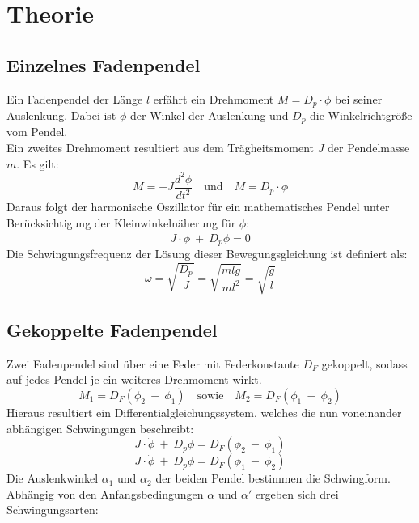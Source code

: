 \section{Theorie}
\label{sec:Theorie}

\subsection{Einzelnes Fadenpendel}
Ein Fadenpendel der Länge $l$ erfährt ein Drehmoment $M = D_p\cdot \phi$ bei seiner Auslenkung.
Dabei ist $\phi$ der Winkel der Auslenkung und $D_p$ die Winkelrichtgröße vom Pendel.\\
Ein zweites Drehmoment resultiert aus dem Trägheitsmoment $J$ der Pendelmasse $m$.
Es gilt:
\begin{equation}
    M = -J\frac{d^2\phi}{dt^2} \quad\textrm{und}\quad M = D_p\cdot \phi
\end{equation}
Daraus folgt der harmonische Oszillator für ein mathematisches Pendel unter Berücksichtigung der Kleinwinkelnäherung für $\phi$:
\begin{equation}
    J\cdot \ddot{\phi}\ +\ D_p\phi = 0
\end{equation}
Die Schwingungsfrequenz der Lösung dieser Bewegungsgleichung ist definiert als:
\begin{equation}
    \omega = \sqrt{\frac{D_p}{J}} = \sqrt{\frac{mlg}{ml^2}} = \sqrt{\frac{g}{l}}
    \label{eq:swingfreq}
\end{equation}

\subsection{Gekoppelte Fadenpendel}
Zwei Fadenpendel sind über eine Feder mit Federkonstante $D_F$ gekoppelt, sodass auf jedes Pendel je ein weiteres Drehmoment wirkt.
\begin{equation}
    M_1 = D_F(\phi_2\ -\ \phi_1) \quad\textrm{sowie}\quad M_2 = D_F(\phi_1\ -\ \phi_2)
\end{equation}
Hieraus resultiert ein Differentialgleichungssystem, welches die nun voneinander abhängigen Schwingungen beschreibt:
\begin{equation}
    J\cdot \ddot{\phi}\ +\ D_p\phi = D_F(\phi_2\ -\ \phi_1)
\end{equation}
\begin{equation}
    J\cdot \ddot{\phi}\ +\ D_p\phi = D_F(\phi_1\ -\ \phi_2)
\end{equation}
Die Auslenkwinkel $\alpha_1$ und $\alpha_2$ der beiden Pendel bestimmen die Schwingform.
Abhängig von den Anfangsbedingungen $\alpha$ und $\alpha'$ ergeben sich drei Schwingungsarten:
